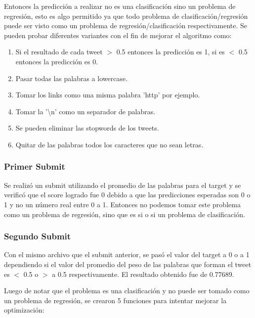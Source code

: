 \documentclass[12pt]{article}
\begin{document}
Entonces la predicción a realizar no es una clasificación sino un problema de regresión, esto es algo permitido ya que todo problema de clasificación/regresión puede ser visto como un problema de regresión/clasificación respectivamente.
Se pueden probar diferentes variantes  con el fin de mejorar el algoritmo como:

\begin{enumerate}
  \item Si el resultado de cada tweet $>$ 0.5 entonces la predicción es 1, si es $<$ 0.5 entonces la predicción es 0.
  \item Pasar todas las palabras a lowercase.
  \item Tomar los links como una misma palabra 'http' por ejemplo.
  \item Tomar la '\textbackslash n' como un separador de palabras.
  \item Se pueden eliminar las stopwords de los tweets.
  \item Quitar de las palabras todos los caracteres que no sean letras.
\end{enumerate}

\subsubsection{Primer Submit}
Se realizó un submit utilizando el promedio de las palabras para el target y se verificó que el score logrado fue 0 debido a que las predicciones esperadas son 0 o 1 y no un número real entre 0 a 1.
Entonces no podemos tomar este problema como un problema de regresión, sino que es si o si un problema de clasificación.

\subsubsection{Segundo Submit}
Con el mismo archivo que el submit anterior, se pasó el valor del target a 0 o a 1 dependiendo si el valor del promedio del peso de las palabras que forman el tweet es $<$ 0.5 o $>$ a 0.5 respectivamente.
El resultado obtenido fue de 0.77689.

Luego de notar que el problema es una clasificación y no puede ser tomado como un problema de regresión, se crearon 5 funciones para intentar mejorar la optimización:
\end{document}

